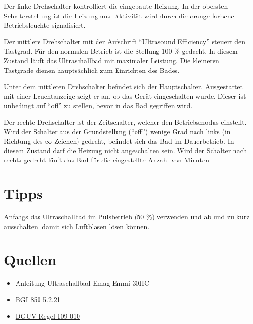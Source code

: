 \documentclass{\basedir/fablab-document}
\begin{document}
Der linke Drehschalter kontrolliert die eingebaute Heizung.
In der obersten Schalterstellung ist die Heizung aus.
Aktivität wird durch die orange-farbene Betriebsleuchte signalisiert.

Der mittlere Drehschalter mit der Aufschrift \enquote{Ultrasound Efficiency} steuert den Tastgrad.
Für den normalen Betrieb ist die Stellung 100 \% gedacht.
In diesem Zustand läuft das Ultraschallbad mit maximaler Leistung.
Die kleineren Tastgrade dienen hauptsächlich zum Einrichten des Bades.

Unter dem mittleren Drehschalter befindet sich der Hauptschalter.
Ausgestattet mit einer Leuchtanzeige zeigt er an, ob das Gerät eingeschalten wurde.
Dieser ist unbedingt auf \enquote{off} zu stellen, bevor in das Bad gegriffen wird.

Der rechte Drehschalter ist der Zeitschalter, welcher den Betriebsmodus einstellt.
Wird der Schalter aus der Grundstellung (\enquote{off}) wenige Grad nach links (in Richtung des $\infty$-Zeichen) gedreht, befindet sich das Bad im Dauerbetrieb.
In diesem Zustand darf die Heizung nicht angeschalten sein.
Wird der Schalter nach rechts gedreht läuft das Bad für die eingestellte Anzahl von Minuten.


\section{Tipps}
Anfangs das Ultraschallbad im Pulsbetrieb (50 \%) verwenden und ab und zu kurz ausschalten, damit sich Luftblasen lösen können.

 \section{Quellen}
  \begin{itemize}
   \item Anleitung Ultraschallbad Emag Emmi-30HC
   \item \href{http://bgi850-0.vur.jedermann.de/index.jsp?isbn=bgi850-0&alias=bgc_bi850_0_bi850_0_s5_2_21_}{BGI 850 5.2.21}
   \item \href{http://www.arbeitssicherheit.de/de/html/library/document/4989034,37}{DGUV Regel 109-010}
  \end{itemize}


\end{document}
